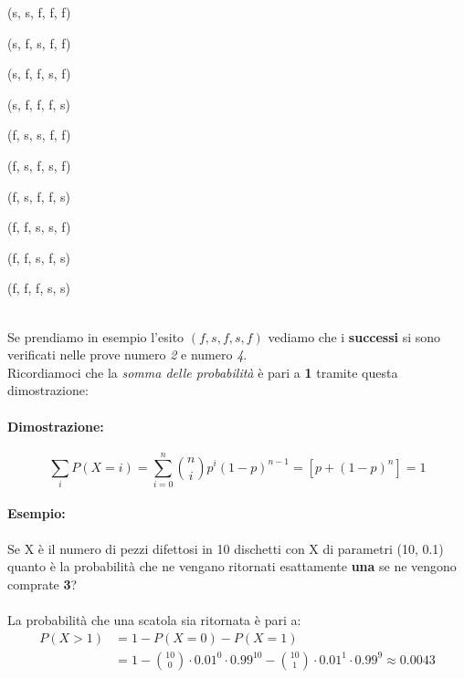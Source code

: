 \documentclass[]{article}
\begin{document}
    \begin{minipage}{0.2\textwidth}
        (s, s, f, f, f)
    \end{minipage}
    \begin{minipage}{0.2\textwidth}
        (s, f, s, f, f)
    \end{minipage}
    \begin{minipage}{0.2\textwidth}
        (s, f, f, s, f)
    \end{minipage}
    \begin{minipage}{0.2\textwidth}
        (s, f, f, f, s)
    \end{minipage}
    \begin{minipage}{0.2\textwidth}
        (f, s, s, f, f)
    \end{minipage}
    \begin{minipage}{0.2\textwidth}
        (f, s, f, s, f)
    \end{minipage}
    \begin{minipage}{0.2\textwidth}
        (f, s, f, f, s)
    \end{minipage}
    \begin{minipage}{0.2\textwidth}
        (f, f, s, s, f)
    \end{minipage}
    \begin{minipage}{0.2\textwidth}
        (f, f, s, f, s)
    \end{minipage}
    \begin{minipage}{0.2\textwidth}
        (f, f, f, s, s)
    \end{minipage} \\
    \linebreak
    Se prendiamo in esempio l'esito $(f, s, f, s, f)$ vediamo che i \textbf{successi} 
    si sono verificati nelle prove numero \textit{2} e numero \textit{4}. \\
    Ricordiamoci che la \textit{somma delle probabilità} è pari a \textbf{1} tramite questa dimostrazione:
    \paragraph{Dimostrazione:}
    \[ \sum_{i}^{} P(X = i) = \sum_{i = 0}^{n} \binom{n}{i} p^i (1-p)^{n-1} = [p + (1 - p)^n] = 1 \]


    \paragraph{Esempio:} Se X è il numero di pezzi difettosi in 10 dischetti con X di parametri (10, 0.1) quanto è
    la probabilità che ne vengano ritornati esattamente \textbf{una} se ne vengono comprate \textbf{3}? \\ \\
    La probabilità che una scatola sia ritornata è pari a:
    \begin{equation*}
        \begin{split}
            P(X > 1) &= 1 - P(X = 0) - P(X = 1) \\
            & = 1 - \binom{10}{0} \cdot 0.01^0 \cdot 0.99^{10} - \binom{10}{1} \cdot 0.01^1 \cdot 0.99^9 \approx 0.0043
        \end{split}
    \end{equation*}
\end{document}
